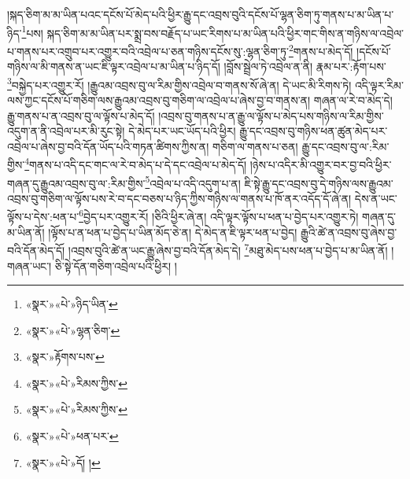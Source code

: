 །སྐད་ཅིག་མ་མ་ཡིན་པའང་དངོས་པོ་མེད་པའི་ཕྱིར་རྒྱུ་དང་འབྲས་བུའི་དངོས་པོ་ལྷན་ཅིག་ཏུ་གནས་པ་མ་ཡིན་པ་ཉིད་\footnote{«སྣར་»«པེ་»ཉིད་ཡིན་}པས། སྐད་ཅིག་མ་མ་ཡིན་པར་སྨྲ་བས་བརྗོད་པ་ཡང་རིགས་པ་མ་ཡིན་པའི་ཕྱིར་གང་གིས་ན་གཉིས་ལ་འབྲེལ་པ་གནས་པར་འགྲུབ་པར་འགྱུར་བའི་འབྲེལ་པ་ཅན་གཉིས་དངོས་སུ་:ལྷན་ཅིག་ཏུ་\footnote{«སྣར་»«པེ་»ལྷན་ཅིག་}གནས་པ་མེད་དོ། །དངོས་པོ་གཉིས་ལ་མི་གནས་ན་ཡང་ཇི་ལྟར་འབྲེལ་པ་མ་ཡིན་པ་ཉིད་དོ། །བློས་སྦྲེལ་ཏེ་འབྲེལ་ན་ནི། རྣམ་པར་:རྟོག་པས་\footnote{«སྣར་»རྟོགས་པས་}བསྐྱེད་པར་འགྱུར་རོ། །རྒྱུའམ་འབྲས་བུ་ལ་རིམ་གྱིས་འབྲེལ་བ་གནས་སོ་ཞེ་ན། དེ་ཡང་མི་རིགས་ཏེ། འདི་ལྟར་རིམ་ལས་ཀྱང་དངོས་པོ་གཅིག་ལས་རྒྱུའམ་འབྲས་བུ་གཅིག་ལ་འབྲེལ་པ་ཞེས་བྱ་བ་གནས་ན། གཞན་ལ་རེ་བ་མེད་དེ། རྒྱུ་གནས་པ་ན་འབྲས་བུ་ལ་ལྟོས་པ་མེད་དོ། །འབྲས་བུ་གནས་པ་ན་རྒྱུ་ལ་ལྟོས་པ་མེད་པས་གཉིས་ལ་རིམ་གྱིས་འདུག་ན་ནི་འབྲེལ་པར་མི་རུང་སྟེ། དེ་མེད་པར་ཡང་ཡོད་པའི་ཕྱིར། རྒྱུ་དང་འབྲས་བུ་གཉིས་ཕན་ཚུན་མེད་པར་འབྲེལ་པ་ཞེས་བྱ་བའི་དོན་ཡོད་པའི་གཏན་ཚིགས་ཀྱིས་ན། གཅིག་ལ་གནས་པ་ཅན། རྒྱུ་དང་འབྲས་བུ་ལ་:རིམ་གྱིས་\footnote{«སྣར་»«པེ་»རིམས་ཀྱིས་}གནས་པ་འདི་དང་གང་ལ་རེ་བ་མེད་པ་དེ་དང་འབྲེལ་པ་མེད་དོ། །ཉེས་པ་འདིར་མི་འགྱུར་བར་བྱ་བའི་ཕྱིར་གཞན་དུ་རྒྱུའམ་འབྲས་བུ་ལ་:རིམ་གྱིས་\footnote{«སྣར་»«པེ་»རིམས་ཀྱིས་}འབྲེལ་པ་འདི་འདུག་པ་ན། ཇི་སྟེ་རྒྱུ་དང་འབྲས་བུ་དེ་གཉིས་ལས་རྒྱུའམ་འབྲས་བུ་གཅིག་ལ་ལྟོས་པས་རེ་བ་དང་བཅས་པ་ཉིད་ཀྱིས་གཉིས་ལ་གནས་པ་ཁོ་ནར་འདོད་དོ་ཞེ་ན། དེས་ན་ཡང་ལྟོས་པ་དེས་:ཕན་པ་\footnote{«སྣར་»«པེ་»ཕན་པར་}བྱེད་པར་འགྱུར་རོ། །ཅིའི་ཕྱིར་ཞེ་ན། འདི་ལྟར་ལྟོས་པ་ཕན་པ་བྱེད་པར་འགྱུར་ཏེ། གཞན་དུ་མ་ཡིན་ནོ། །ལྟོས་པ་ན་ཕན་པ་བྱེད་པ་ཡིན་མོད་ཅེ་ན། དེ་མེད་ན་ཇི་ལྟར་ཕན་པ་བྱེད། རྒྱུའི་ཚེ་ན་འབྲས་བུ་ཞེས་བྱ་བའི་དོན་མེད་དོ། །འབྲས་བུའི་ཚེ་ན་ཡང་རྒྱུ་ཞེས་བྱ་བའི་དོན་མེད་དེ། \footnote{«སྣར་»«པེ་»དོ། ། }མཐུ་མེད་པས་ཕན་པ་བྱེད་པ་མ་ཡིན་ནོ། །གཞན་ཡང་། ཅི་སྟེ་དོན་གཅིག་འབྲེལ་པའི་ཕྱིར། །
